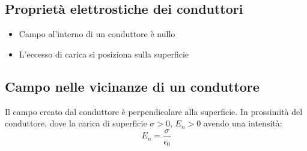 \subsection{Proprietà elettrostiche dei conduttori}
\begin{itemize}
    \item Campo al'interno di un conduttore è nullo
    \item L'eccesso di carica si posiziona sulla superficie
\end{itemize}

\subsection{Campo nelle vicinanze di un conduttore}
Il campo creato dal conduttore è perpendicolare alla superficie.
In prossimità del conduttore, dove la carica di superficie $\sigma>0$, 
$E_n > 0$ avendo una intensità:
\begin{equation}
    E_n = \frac{\sigma}{\epsilon_0}
\end{equation}